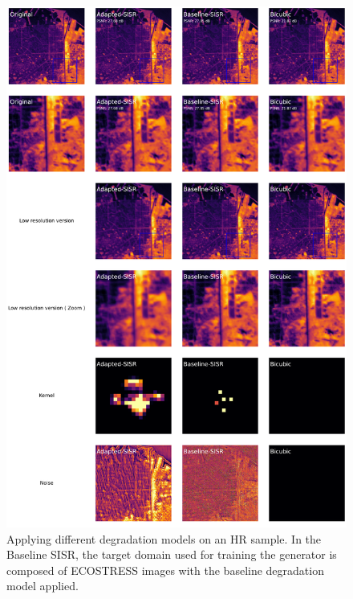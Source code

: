         \begin{figure}[h!]
            \centering
            \includegraphics[scale=0.28]{Includes/6-source_prediction-sample.pdf}
            \caption{Applying different degradation models on an HR sample. In the Baseline SISR, the target domain used for training the generator is composed of ECOSTRESS images with the baseline degradation model applied.  }
            \label{fig:6-source_domain_sample}
        \end{figure}

